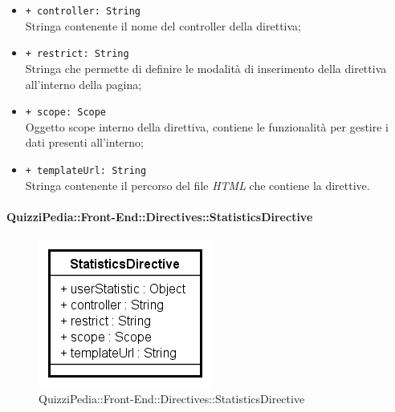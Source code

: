 \begin{itemize}
\begin{itemize}
		\item \texttt{+ controller: String} \\ Stringa contenente il nome del controller della direttiva;
		\item \texttt{+ restrict: String} \\ Stringa che permette di definire le modalità di inserimento della direttiva all'interno della pagina;
		\item \texttt{+ scope: Scope} \\ Oggetto scope interno della direttiva, contiene le funzionalità per gestire i dati presenti all'interno;
		\item \texttt{+ templateUrl: String} \\ Stringa contenente il percorso del file \textit{HTML} che contiene la direttive.
	\end{itemize}
\end{itemize}

\paragraph{QuizziPedia::Front-End::Directives::StatisticsDirective}

\label{QuizziPedia::Front-End::Directives::StatisticsDirective}

\begin{figure}[h]
	\centering
	\includegraphics[scale=0.80,keepaspectratio]{UML/Classi/Front-End/QuizziPedia_Front-end_Directives_StatisticsDirective.png}
	\caption{QuizziPedia::Front-End::Directives::StatisticsDirective}
\end{figure}

